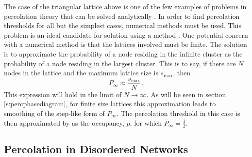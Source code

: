 The case of the triangular lattice above is one of the few examples of problems in percolation theory that can be solved analytically \cite{Kirkpatrick1973}.
In order to find percolation thresholds for all but the simplest cases, numerical methods must be used.
This problem is an ideal candidate for solution using a \mc{} method \cite{Frisch1962,Dean1967}.
One potential concern with a numerical method is that the lattices involved must be finite.
The solution is to approximate the probability of a node residing in the infinite cluster as the probability of a node residing in the largest cluster. 
This is to say, if there are $N$ nodes in the lattice and the maximum lattice size is $s_{\text{max}}$, then
\begin{equation}
	P_{\infty}\approx \frac{s_\text{max}}{N}\,.
\end{equation} 
This expression will hold in the limit of $N\rightarrow \infty$.
As will be seen in section \ref{s:percphasediagram}, for finite size lattices this approximation leads to smoothing of the step\--like form of $P_{\infty}$.
The percolation threshold in this case is then approximated by as the occupancy, $p$, for which $P_{\infty}=\frac{1}{2}$.

\subsection{Percolation in Disordered Networks}

